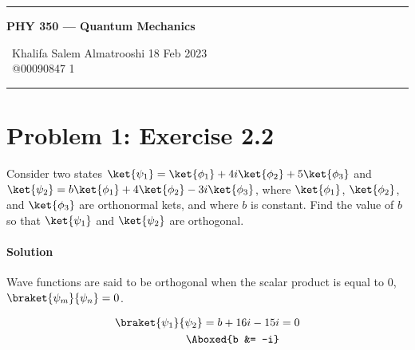 \documentclass{article}
\begin{document}
	
	\begin{center}
		\hrule
		\vspace{0.4cm}
		\textbf { \Large PHY 350 --- Quantum Mechanics}
		\vspace{0.4cm}
	\end{center}
		 \ Khalifa Salem Almatrooshi \hspace{\fill}  18 Feb 2023 \\
		 \ @00090847 \hspace{\fill}  1 \\
		\hrule	
	
	\section*{Problem 1: Exercise 2.2}
	Consider two states $\ket{\psi_1} = \ket{\phi_1} + 4i\ket{\phi_2} + 5\ket{\phi_3}$ and $\ket{\psi_2} = b\ket{\phi_1} + 4\ket{\phi_2} - 3i\ket{\phi_3}$, where $\ket{\phi_1}$, $\ket{\phi_2}$, and $\ket{\phi_3}$ are orthonormal kets, and where $b$ is constant. Find the value of $b$ so that $\ket{\psi_1}$ and $\ket{\psi_2}$ are orthogonal. 
		\paragraph{Solution} Wave functions are said to be orthogonal when the scalar product is equal to 0, $\braket{\psi_m}{\psi_n} = 0$. 
		
		\begin{align*}
			\braket{\psi_1}{\psi_2} = b + 16i - 15i &= 0 \\
			\Aboxed{b &= -i}
		\end{align*}
		
		
\end{document}
